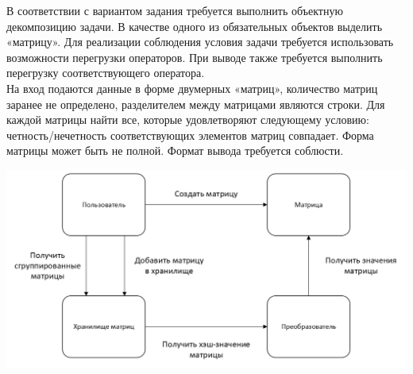 \documentclass[a4paper,14pt]{extarticle}
\begin{document}
В соответствии с вариантом задания требуется выполнить объектную декомпозицию задачи.
В качестве одного из обязательных объектов выделить «матрицу». Для реализации
соблюдения условия задачи требуется использовать возможности перегрузки операторов.
При выводе также требуется выполнить перегрузку соответствующего оператора.\\
На вход подаются данные в форме двумерных «матриц», количество матриц заранее не
определено, разделителем между матрицами являются строки. Для каждой матрицы найти
все, которые удовлетворяют следующему условию: четность/нечетность соответствующих
элементов матриц совпадает. Форма матрицы может быть не полной. Формат вывода
требуется соблюсти.\\
\begin{center}
    \includegraphics[width=140mm]{decomp.png}
\end{center}
\end{document}
